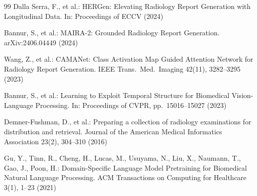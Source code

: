 \documentclass[runningheads]{llncs}
\begin{document}
\begin{thebibliography}{99}
Dalla Serra, F., et al.: HERGen: Elevating Radiology Report Generation
with Longitudinal Data.
In: Proceedings of ECCV (2024)

Bannur, S., et al.: MAIRA-2: Grounded Radiology Report Generation.
arXiv:2406.04449 (2024)

Wang, Z., et al.: CAMANet: Class Activation Map Guided Attention Network
for Radiology Report Generation.
IEEE Trans.\ Med.\ Imaging 42(11), 3282--3295 (2023)

Bannur, S., et al.: Learning to Exploit Temporal Structure for
Biomedical Vision-Language Processing.
In: Proceedings of CVPR, pp.~15016--15027 (2023)

Demner-Fushman, D., et al.: Preparing a collection of radiology examinations
for distribution and retrieval.
Journal of the American Medical Informatics Association 23(2), 304--310 (2016)

Gu, Y., Tinn, R., Cheng, H., Lucas, M., Usuyama, N., Liu, X., Naumann, T.,
Gao, J., Poon, H.: Domain-Specific Language Model Pretraining for Biomedical
Natural Language Processing.
ACM Transactions on Computing for Healthcare 3(1), 1--23 (2021)

\end{thebibliography}
\end{document}
